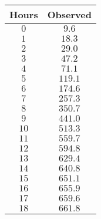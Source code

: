 \begin{tabular}{cc} \toprule
Hours & Observed \\\midrule
$0$   & $9.6$    \\[4pt]
$1$   & $18.3$   \\[4pt]
$2$   & $29.0$   \\[4pt]
$3$   & $47.2$   \\[4pt]
$4$   & $71.1$   \\[4pt]
$5$   & $119.1$  \\[4pt]
$6$   & $174.6$  \\[4pt]
$7$   & $257.3$  \\[4pt]
$8$   & $350.7$  \\[4pt]
$9$   & $441.0$  \\[4pt]
$10$  & $513.3$  \\[4pt]
$11$  & $559.7$  \\[4pt]
$12$  & $594.8$  \\[4pt]
$13$  & $629.4$  \\[4pt]
$14$  & $640.8$  \\[4pt]
$15$  & $651.1$  \\[4pt]
$16$  & $655.9$  \\[4pt]
$17$  & $659.6$  \\[4pt]
$18$  & $661.8$  \\\bottomrule
\end{tabular}
